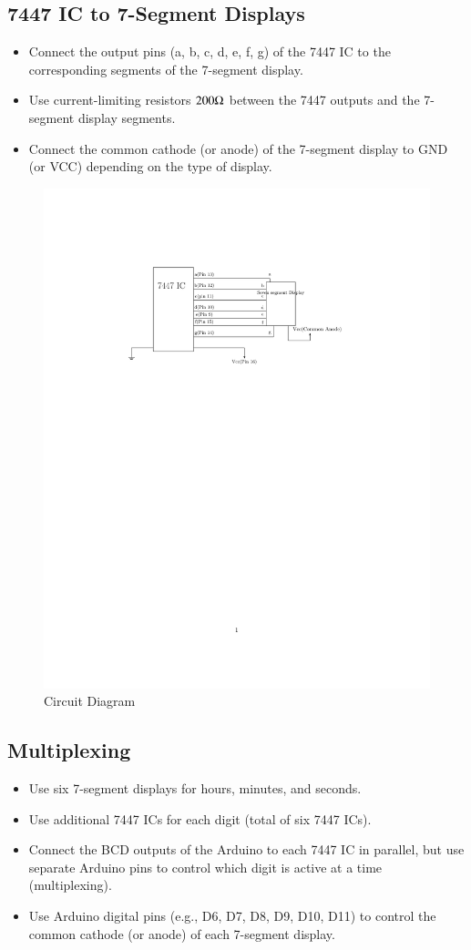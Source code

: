 \documentclass[journal]{IEEEtran}
\begin{document}
\subsection{7447 IC to 7-Segment Displays}
\begin{itemize}
    \item Connect the output pins (a, b, c, d, e, f, g) of the 7447 IC to the corresponding segments of the 7-segment display.
    \item Use current-limiting resistors $200\ohm$ between the 7447 outputs and the 7-segment display segments.
    \item Connect the common cathode (or anode) of the 7-segment display to GND (or VCC) depending on the type of display.
\end{itemize}
\begin{figure}[H]
    \centering
    \includegraphics[width=0.8\linewidth]{figure/fig2.png}
    \caption{Circuit Diagram}
    \label{fig:circuit}
\end{figure}


\subsection{Multiplexing}
\begin{itemize}
    \item Use six 7-segment displays for hours, minutes, and seconds.
    \item Use additional 7447 ICs for each digit (total of six 7447 ICs).
    \item Connect the BCD outputs of the Arduino to each 7447 IC in parallel, but use separate Arduino pins to control which digit is active at a time (multiplexing).
    \item Use Arduino digital pins (e.g., D6, D7, D8, D9, D10, D11) to control the common cathode (or anode) of each 7-segment display.
\end{itemize}
\end{document}
